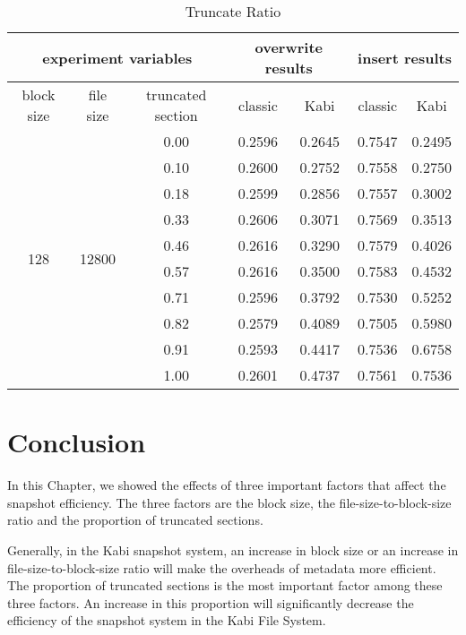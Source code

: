 \begin{table}[t]
\begin{center}
\begin{tabular}{|c|c|c|cccc|}
\hline
\multicolumn{3}{|c|}{experiment variables} & \multicolumn{2}{c|}{overwrite results} & \multicolumn{2}{c|}{insert results}\\
\hline
block size & file size & truncated section & \multicolumn{1}{c|}{classic} & \multicolumn{1}{c|}{Kabi} & \multicolumn{1}{c|}{classic} & Kabi\\
\hline
\multirow{10}{*}{128} & \multirow{10}{*}{12800} & 0.00 & 0.2596 & 0.2645 & 0.7547 & 0.2495 \\
&& 0.10 & 0.2600 & 0.2752 & 0.7558 & 0.2750 \\
&& 0.18 & 0.2599 & 0.2856 & 0.7557 & 0.3002 \\
&& 0.33 & 0.2606 & 0.3071 & 0.7569 & 0.3513 \\
&& 0.46 & 0.2616 & 0.3290 & 0.7579 & 0.4026 \\
&& 0.57 & 0.2616 & 0.3500 & 0.7583 & 0.4532 \\
&& 0.71 & 0.2596 & 0.3792 & 0.7530 & 0.5252 \\
&& 0.82 & 0.2579 & 0.4089 & 0.7505 & 0.5980 \\
&& 0.91 & 0.2593 & 0.4417 & 0.7536 & 0.6758 \\
&& 1.00 & 0.2601 & 0.4737 & 0.7561 & 0.7536 \\
\hline
\end{tabular}
\end{center}
\caption{Truncate Ratio}
\label{tab:truncate_ratio}
\end{table}

\section{Conclusion}

    In this Chapter, we showed the effects of three important factors that affect the snapshot efficiency. The three factors are the block size, the file-size-to-block-size ratio and the proportion of truncated sections.

    Generally, in the Kabi snapshot system, an increase in block size or an increase in file-size-to-block-size ratio will make the overheads of metadata more efficient. The proportion of truncated sections is the most important factor among these three factors. An increase in this proportion will significantly decrease the efficiency of the snapshot system in the Kabi File System.
